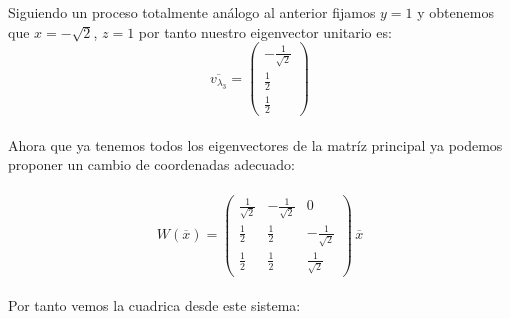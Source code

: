 \documentclass[11pt,letterpaper]{article}
\begin{document}
    Siguiendo un proceso totalmente an\'alogo al anterior fijamos $y=1$ y obtenemos que $x=-\sqrt{2}$, $z=1$
    por tanto
    nuestro eigenvector unitario es:
    \,\\
    \begin{equation*}
        \overline{v_{\lambda_3}}=\begin{pmatrix}
                -\frac{1}{\sqrt{2}}\\
                \frac{1}{2}\\
                \frac{1}{2}
                \end{pmatrix}
    \end{equation*}\,\\
    Ahora que ya tenemos todos los eigenvectores de la matr\'iz principal ya podemos proponer un cambio de coordenadas adecuado:\,\\
    \,\\
    \begin{equation*}
        W(\overline{x})=
        \begin{pmatrix}
                \frac{1}{\sqrt{2}} & -\frac{1}{\sqrt{2}} & 0\\
                \frac{1}{2} & \frac{1}{2}& -\frac{1}{\sqrt{2}}\\
                 \frac{1}{2} & \frac{1}{2} &\frac{1}{\sqrt{2}}
                \end{pmatrix}\,\overline{x}
    \end{equation*}\,\\
    Por tanto vemos la cuadrica desde este sistema:\,\\
    \,\\
\end{document}

